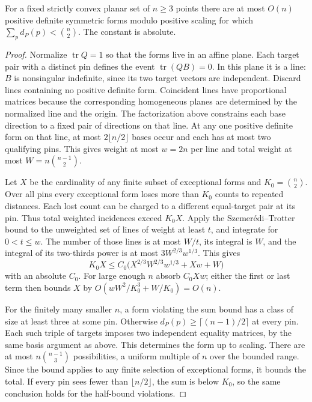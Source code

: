 \begin{theorem}[982-A01]
For a fixed strictly convex planar set of \(n\ge3\) points there are at most \(O(n)\) positive definite symmetric forms modulo positive scaling for which \(\sum_p d_P(p)<\binom n2\). The constant is absolute.
\end{theorem}

\begin{proof}
Normalize \(\operatorname{tr}Q=1\) so that the forms live in an affine plane. Each target pair with a distinct pin defines the event \(\operatorname{tr}(QB)=0\). In this plane it is a line: \(B\) is nonsingular indefinite, since its two target vectors are independent. Discard lines containing no positive definite form. Coincident lines have proportional matrices because the corresponding homogeneous planes are determined by the normalized line and the origin. The factorization above constrains each base direction to a fixed pair of directions on that line. At any one positive definite form on that line, at most \(2\lfloor n/2\rfloor\) bases occur and each has at most two qualifying pins. This gives weight at most \(w=2n\) per line and total weight at most \(W=n\binom{n-1}{2}\).

Let \(X\) be the cardinality of any finite subset of exceptional forms and \(K_0=\binom n2\). Over all pins every exceptional form loses more than \(K_0\) counts to repeated distances. Each lost count can be charged to a different equal-target pair at its pin. Thus total weighted incidences exceed \(K_0X\). Apply the Szemer\'edi--Trotter bound \cite{st} to the unweighted set of lines of weight at least \(t\), and integrate for \(0<t\le w\). The number of those lines is at most \(W/t\), its integral is \(W\), and the integral of its two-thirds power is at most \(3 W^{2/3}w^{1/3}\). This gives
\[
 K_0X\le C_0\bigl(X^{2/3}W^{2/3}w^{1/3}+Xw+W\bigr)
\]
with an absolute \(C_0\). For large enough \(n\) absorb \(C_0Xw\); either the first or last term then bounds \(X\) by \(O(wW^2/K_0^3+W/K_0)=O(n)\).

For the finitely many smaller \(n\), a form violating the sum bound has a class of size at least three at some pin. Otherwise \(d_P(p)\ge\lceil(n-1)/2\rceil\) at every pin. Each such triple of targets imposes two independent equality matrices, by the same basis argument as above. This determines the form up to scaling. There are at most \(n\binom{n-1}{3}\) possibilities, a uniform multiple of \(n\) over the bounded range. Since the bound applies to any finite selection of exceptional forms, it bounds the total. If every pin sees fewer than \(\lfloor n/2\rfloor\), the sum is below \(K_0\), so the same conclusion holds for the half-bound violations.
\end{proof}

